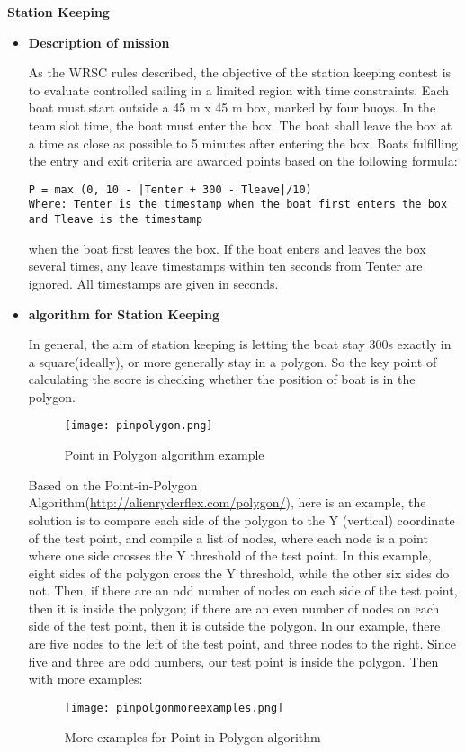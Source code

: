 \item{\textbf{Station Keeping}}
\begin{itemize}
\item{\textbf{Description of mission}}


As the WRSC rules described, the objective of the station keeping contest is to evaluate controlled sailing in a limited region with time constraints. Each boat must start outside a 45 m x 45 m box, marked by four buoys. In the team slot time, the boat must enter the box. The boat shall leave the box at a time as close as possible to 5 minutes after entering the box. Boats fulfilling the entry and exit criteria are awarded points based on the following formula:
\begin{lstlisting}
P = max (0, 10 - |Tenter + 300 - Tleave|/10)
Where: Tenter is the timestamp when the boat first enters the box and Tleave is the timestamp
\end{lstlisting}
when the boat first leaves the box. If the boat enters and leaves the box several times, any leave timestamps within ten seconds from Tenter are ignored. All timestamps are given in seconds.


\item{\textbf{algorithm for Station Keeping}}


In general, the aim of station keeping is letting the boat stay 300s exactly in a square(ideally), or more generally stay in a polygon. So the key point of calculating the score is checking whether the position of boat is in the polygon.
\begin{figure}[h!]
    \centering
    \texttt{[image: pinpolygon.png]}
    \caption{Point in Polygon algorithm example }
    \label{fig-sample}
\end{figure}

Based on the Point-in-Polygon Algorithm(\url{http://alienryderflex.com/polygon/}), here is an example, the solution is to compare each side of the polygon to the Y (vertical) coordinate of the test point, and compile a list of nodes, where each node is a point where one side crosses the Y threshold of the test point. In this example, eight sides of the polygon cross the Y threshold, while the other six sides do not. Then, if there are an odd number of nodes on each side of the test point, then it is inside the polygon; if there are an even number of nodes on each side of the test point, then it is outside the polygon. In our example, there are five nodes to the left of the test point, and three nodes to the right. Since five and three are odd numbers, our test point is inside the polygon.
Then with more examples:
\begin{figure}[h!]
    \centering
    \texttt{[image: pinpolgonmoreexamples.png]}
    \caption{More examples for Point in Polygon algorithm}
    \label{fig-sample}
\end{figure}

\end{itemize}
